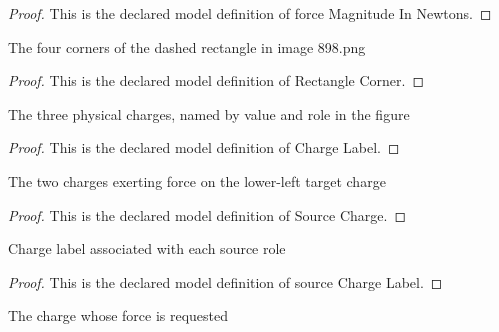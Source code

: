 \begin{proof}
  This is the declared model definition of force Magnitude In Newtons.
\end{proof}
\begin{definition}
  \label{def:physics:phyx-mini-0898:phyxminiproblems-problemphyxmini0898-rectanglecorner}
  The four corners of the dashed rectangle in image 898.png
\end{definition}
\begin{proof}
  This is the declared model definition of Rectangle Corner.
\end{proof}
\begin{definition}
  \label{def:physics:phyx-mini-0898:phyxminiproblems-problemphyxmini0898-chargelabel}
  The three physical charges, named by value and role in the figure
\end{definition}
\begin{proof}
  This is the declared model definition of Charge Label.
\end{proof}
\begin{definition}
  \label{def:physics:phyx-mini-0898:phyxminiproblems-problemphyxmini0898-sourcecharge}
  The two charges exerting force on the lower-left target charge
\end{definition}
\begin{proof}
  This is the declared model definition of Source Charge.
\end{proof}
\begin{definition}
  \label{def:physics:phyx-mini-0898:phyxminiproblems-problemphyxmini0898-sourcechargelabel}
  Charge label associated with each source role
\end{definition}
\begin{proof}
  This is the declared model definition of source Charge Label.
\end{proof}
\begin{definition}
  \label{def:physics:phyx-mini-0898:phyxminiproblems-problemphyxmini0898-targetchargelabel}
  The charge whose force is requested
\end{definition}
